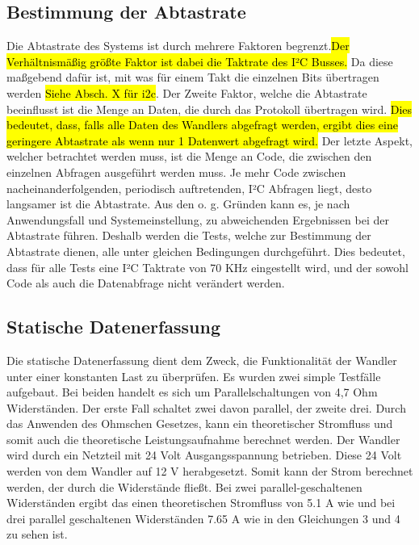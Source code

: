 \subsection{Bestimmung der Abtastrate}
Die Abtastrate des Systems ist durch mehrere Faktoren begrenzt.\hl{Der Verhältnismäßig größte Faktor ist dabei die Taktrate des I²C Busses.} Da diese maßgebend dafür ist, mit was für einem Takt die einzelnen Bits übertragen werden \hl{Siehe Absch. X für i2c}. Der Zweite Faktor, welche die Abtastrate beeinflusst ist die Menge an Daten, die durch das Protokoll übertragen wird. \hl{Dies bedeutet, dass, falls alle Daten des Wandlers abgefragt werden, ergibt dies eine geringere Abtastrate als wenn nur 1 Datenwert abgefragt wird.} Der letzte Aspekt, welcher betrachtet werden muss, ist die Menge an Code, die zwischen den einzelnen Abfragen ausgeführt werden muss. Je mehr Code zwischen nacheinanderfolgenden, periodisch auftretenden, I²C Abfragen liegt, desto langsamer ist die Abtastrate. Aus den o. g. Gründen kann es, je nach Anwendungsfall und Systemeinstellung, zu abweichenden Ergebnissen bei der Abtastrate führen. Deshalb werden die Tests, welche zur Bestimmung der Abtastrate dienen, alle unter gleichen Bedingungen durchgeführt. Dies bedeutet, dass für alle Tests eine I²C Taktrate von 70 KHz eingestellt wird, und der sowohl Code als auch die Datenabfrage nicht verändert werden.



\subsection{Statische Datenerfassung}

Die statische Datenerfassung dient dem Zweck, die Funktionalität der Wandler unter einer konstanten Last zu überprüfen. Es wurden zwei simple Testfälle aufgebaut. Bei beiden handelt es sich um Parallelschaltungen von 4,7 Ohm Widerständen. Der erste Fall schaltet zwei davon parallel, der zweite drei. Durch das Anwenden des Ohmschen Gesetzes, kann ein theoretischer Stromfluss und somit auch die theoretische Leistungsaufnahme berechnet werden. Der Wandler wird durch ein Netzteil mit 24 Volt Ausgangsspannung betrieben. Diese 24 Volt werden von dem Wandler auf 12 V herabgesetzt. Somit kann der Strom berechnet werden, der durch die Widerstände fließt. Bei zwei parallel-geschaltenen Widerständen ergibt das einen theoretischen Stromfluss von 5.1 A wie und bei drei parallel geschaltenen Widerständen 7.65 A wie in den Gleichungen 3 und 4 zu sehen ist.

